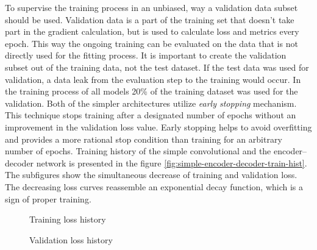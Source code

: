 To supervise the training process in an unbiased, way a validation data subset should be used.
Validation data is a part of the training set that doesn't take part in the gradient calculation, but is used to calculate loss and metrics every epoch.
This way the ongoing training can be evaluated on the data that is not directly used for the fitting process.
It is important to create the validation subset out of the training data, not the test dataset.
If the test data was used for validation, a data leak from the evaluation step to the training would occur.
In the training process of all models 20\% of the training dataset was used for the validation.
Both of the simpler architectures utilize \textit{early stopping} mechanism.
This technique stops training after a designated number of epochs without an improvement in the validation loss value.
Early stopping helps to avoid overfitting and provides a more rational stop condition than training for an arbitrary number of epochs.
Training history of the simple convolutional and the encoder--decoder network is presented in the figure \ref{fig:simple-encoder-decoder-train-hist}.
The subfigures show the simultaneous decrease of training and validation loss.
The decreasing loss curves reassemble an exponential decay function, which is a sign of proper training.
\begin{sidewaysfigure}
    \begin{subfigure}{0.5\textwidth}
    \hfill
        \centering
        \caption{Training loss history}
    \end{subfigure}
    \hfill
    \begin{subfigure}{0.5\textwidth}
        \centering
        \caption{Validation loss history}
    \end{subfigure}
    \hfill
    \caption{Training history of the simple convolutional and encoder--decoder netowrks}
    \label{fig:simple-encoder-decoder-train-hist}
\end{sidewaysfigure}

